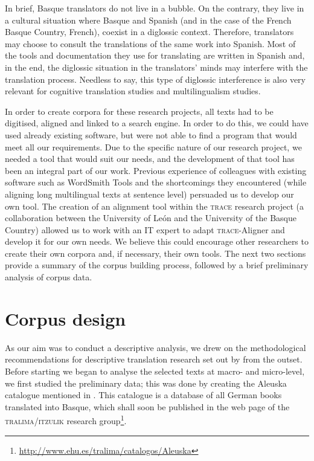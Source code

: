 \documentclass[output=paper]{LSP/langsci}
\begin{document}
In brief, Basque translators do not live in a bubble. On the contrary, they live in a cultural situation where Basque and Spanish (and in the case of the French Basque Country, French), coexist in a diglossic context. Therefore, translators may choose to consult the translations of the same work into Spanish. Most of the tools and documentation they use for translating are written in Spanish and, in the end, the diglossic situation in the translators’ minds may interfere with the translation process. Needless to say, this type of diglossic interference is also very relevant for cognitive translation studies and multilingualism studies.

In order to create corpora for these research projects, all texts had to be digitised, aligned and linked to a search engine. In order to do this, we could have used already existing software, but were not able to find a program that would meet all our requirements. Due to the specific nature of our research project, we needed a tool that would suit our needs, and the development of that tool has been an integral part of our work. Previous experience of colleagues with existing software such as WordSmith Tools and the shortcomings they encountered (while aligning long multilingual texts at sentence level) persuaded us to develop our own tool. The creation of an alignment tool within the \textsc{trace} research project (a collaboration between the University of León and the University of the Basque Country) allowed us to work with an IT expert to adapt \textsc{trace}-Aligner and develop it for our own needs. We believe this could encourage other researchers to create their own corpora and, if necessary, their own tools. The next two sections provide a summary of the corpus building process, followed by a brief preliminary analysis of corpus data.

\section{Corpus design}

As our aim was to conduct a descriptive analysis, we drew on the methodological recommendations for descriptive translation research set out by \citet{Lambert1985} from the outset. Before starting we began to analyse the selected texts at macro- and micro-level, we first studied the preliminary data; this was done by creating the Aleuska catalogue mentioned in . This catalogue is a database of all German books translated into Basque, which shall soon be published in the web page of the \textsc{tralima}/\textsc{itzulik} research group\footnote{\url{http://www.ehu.es/tralima/catalogos/Aleuska}}.
\end{document}
